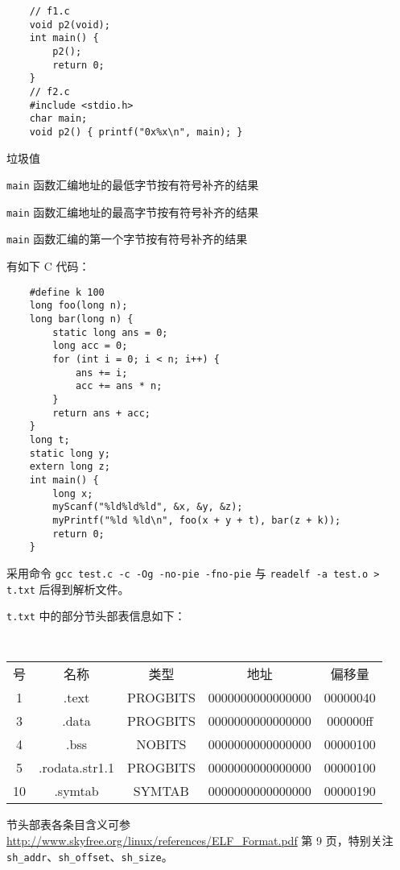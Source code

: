 \begin{problems}
\begin{verbatim}
    // f1.c
    void p2(void);
    int main() {
        p2();
        return 0;
    }
    // f2.c
    #include <stdio.h>
    char main;
    void p2() { printf("0x%x\n", main); }
        \end{verbatim}
        \begin{choices}
            \item 垃圾值
            \item \verb|main| 函数汇编地址的最低字节按有符号补齐的结果
            \item \verb|main| 函数汇编地址的最高字节按有符号补齐的结果
            \item \verb|main| 函数汇编的第一个字节按有符号补齐的结果
        \end{choices}
        \pro 有如下 C 代码：
        \begin{verbatim}
    #define k 100
    long foo(long n);
    long bar(long n) {
        static long ans = 0;
        long acc = 0;
        for (int i = 0; i < n; i++) {
            ans += i;
            acc += ans * n;
        }
        return ans + acc;
    } 
    long t;
    static long y;
    extern long z;
    int main() {
        long x;
        myScanf("%ld%ld%ld", &x, &y, &z);
        myPrintf("%ld %ld\n", foo(x + y + t), bar(z + k));
        return 0;
    }
        \end{verbatim}
        采用命令 \verb|gcc test.c -c -Og -no-pie -fno-pie| 与 \verb|readelf -a test.o > t.txt| 后得到解析文件。

        \verb|t.txt| 中的部分节头部表信息如下：
        \begin{table}[H]
            \tt
            \centering
            \begin{tabular}{|ccccc|}
                \hline
                号 & 名称 & 类型 & 地址 & 偏移量 \\
                1 & .text & PROGBITS & 0000000000000000 & 00000040 \\
                3 & .data & PROGBITS & 0000000000000000 & 000000ff \\
                4 & .bss & NOBITS & 0000000000000000 & 00000100 \\
                5 & .rodata.str1.1 & PROGBITS & 0000000000000000 & 00000100 \\
                10 & .symtab & SYMTAB & 0000000000000000 & 00000190 \\ \hline
            \end{tabular}
        \end{table}
        \begin{hint}
            节头部表各条目含义可参 \url{http://www.skyfree.org/linux/references/ELF\_Format.pdf} 第 9 页，特别关注 \verb|sh_addr|、\verb|sh_offset|、\verb|sh_size|。
        \end{hint}


\end{problems}
